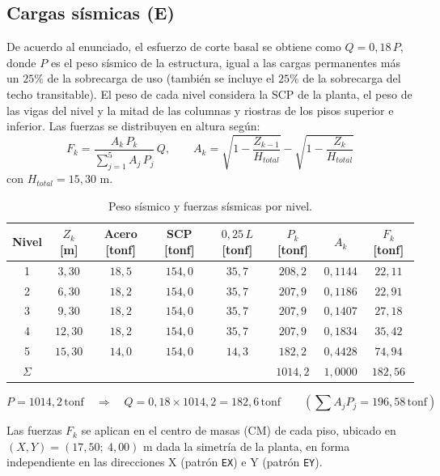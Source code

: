 \documentclass[11pt,letterpaper]{article}
\newcommand{\tonf}{\,\mathrm{tonf}}
\begin{document}
\subsection{Cargas sísmicas (E)}
De acuerdo al enunciado, el esfuerzo de corte basal se obtiene como $Q = 0{,}18\,P$, donde $P$ es el peso
sísmico de la estructura, igual a las cargas permanentes más un $25\%$ de la sobrecarga de uso
(también se incluye el $25\%$ de la sobrecarga del techo transitable). El peso de cada nivel considera la
SCP de la planta, el peso de las vigas del nivel y la mitad de las columnas y riostras de los pisos
superior e inferior. Las fuerzas se distribuyen en altura según:
\begin{equation}
F_k = \frac{A_k\,P_k}{\sum_{j=1}^{5} A_j\,P_j}\,Q,
\qquad
A_k = \sqrt{1-\frac{Z_{k-1}}{H_{total}}} - \sqrt{1-\frac{Z_k}{H_{total}}}
\end{equation}
con $H_{total} = 15{,}30$ m.

\begin{table}[H]
\centering
\caption{Peso sísmico y fuerzas sísmicas por nivel.}
\label{tab:sismo}
\begin{tabular}{cccccccc}
\toprule
Nivel & $Z_k$ [m] & Acero [tonf] & SCP [tonf] & $0{,}25\,L$ [tonf] & $P_k$ [tonf] & $A_k$ & $F_k$ [tonf] \\
\midrule
1 & $3{,}30$ & $18{,}5$ & $154{,}0$ & $35{,}7$ & $208{,}2$ & $0{,}1144$ & $22{,}11$ \\
2 & $6{,}30$ & $18{,}2$ & $154{,}0$ & $35{,}7$ & $207{,}9$ & $0{,}1186$ & $22{,}91$ \\
3 & $9{,}30$ & $18{,}2$ & $154{,}0$ & $35{,}7$ & $207{,}9$ & $0{,}1407$ & $27{,}18$ \\
4 & $12{,}30$ & $18{,}2$ & $154{,}0$ & $35{,}7$ & $207{,}9$ & $0{,}1834$ & $35{,}42$ \\
5 & $15{,}30$ & $14{,}0$ & $154{,}0$ & $14{,}3$ & $182{,}2$ & $0{,}4428$ & $74{,}94$ \\
\midrule
$\Sigma$ & & & & & $1014{,}2$ & $1{,}0000$ & $182{,}56$ \\
\bottomrule
\end{tabular}
\end{table}

\[
P = 1014{,}2\tonf \quad\Rightarrow\quad Q = 0{,}18 \times 1014{,}2 = 182{,}6\tonf
\qquad \left(\textstyle\sum A_j P_j = 196{,}58\tonf\right)
\]

Las fuerzas $F_k$ se aplican en el centro de masas (CM) de cada piso, ubicado en
$(X, Y) = (17{,}50;\ 4{,}00)$ m dada la simetría de la planta, en forma
independiente en las direcciones X (patrón \texttt{EX}) e Y (patrón \texttt{EY}).
\end{document}

